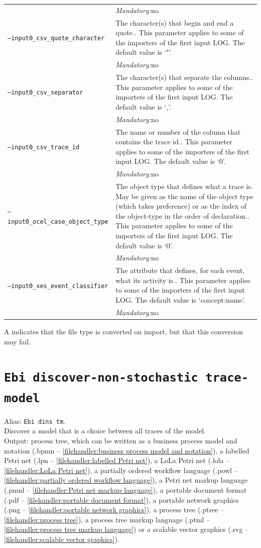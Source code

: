 {\begin{tabularx}{\linewidth}{lX}
&\textit{Mandatory:}\quad no\\
\texttt{--input0\_csv\_quote\_character} & The character(s) that begin and end a quote.. This parameter applies to some of the importers of the first input LOG. The default value is `"'.\\
&\textit{Mandatory:}\quad no\\
\texttt{--input0\_csv\_separator} & The character(s) that separate the columns.. This parameter applies to some of the importers of the first input LOG. The default value is `,'.\\
&\textit{Mandatory:}\quad no\\
\texttt{--input0\_csv\_trace\_id} & The name or number of the column that contains the trace id.. This parameter applies to some of the importers of the first input LOG. The default value is `0'.\\
&\textit{Mandatory:}\quad no\\
\texttt{--input0\_ocel\_case\_object\_type} & The object type that defines what a trace is. May be given as the name of the object type (which takes preference) or as the index of the object-type in the order of declaration.. This parameter applies to some of the importers of the first input LOG. The default value is `0'.\\
&\textit{Mandatory:}\quad no\\
\texttt{--input0\_xes\_event\_classifier} & The attribute that defines, for each event, what its activity is.. This parameter applies to some of the importers of the first input LOG. The default value is `concept:name'.\\
&\textit{Mandatory:}\quad no\\
\bottomrule
\end{tabularx}
A \textdagger{} indicates that the file type is converted on import, but that this conversion may fail.
\clearpage\section{\texttt{Ebi discover-non-stochastic trace-model}}
\label{command:Ebi discover-non-stochastic trace-model}
Alias: \texttt{Ebi dins tm}.\\
Discover a model that is a choice between all traces of the model.\\
\noindent Output: process tree, which can be written as a business process model and notation (.bpmn -- \cref{filehandler:business process model and notation}), a labelled Petri net (.lpn -- \cref{filehandler:labelled Petri net}), a LoLa Petri net (.lola -- \cref{filehandler:LoLa Petri net}), a partially ordered workflow language (.powl -- \cref{filehandler:partially ordered workflow language}), a Petri net markup language (.pnml -- \cref{filehandler:Petri net markup language}), a portable document format (.pdf -- \cref{filehandler:portable document format}), a portable network graphics (.png -- \cref{filehandler:portable network graphics}), a process tree (.ptree -- \cref{filehandler:process tree}), a process tree markup language (.ptml -- \cref{filehandler:process tree markup language}) or a scalable vector graphics (.svg -- \cref{filehandler:scalable vector graphics}).\\
}
